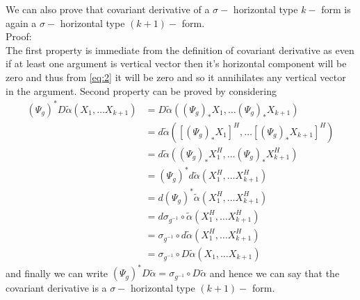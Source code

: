 \documentclass[12pt]{article}
\begin{document}
We can also prove that covariant derivative of a $\sigma-$ horizontal type $k-$ form is again a $\sigma-$ horizontal type $(k+1)-$ form. \\
Proof: \\
The first property is immediate from the definition of covariant derivative
as even if at least one argument is vertical vector then it's horizontal component will be zero and thus from \ref{eq:2} it will be zero and so it annihilates any vertical vector in the argument.
Second property can be proved by considering
\begin{align*}
    (\Psi_{g})^{\ast}D\tilde{\alpha}(X_{1}, \dots X_{k+1}) &= D\tilde{\alpha}((\Psi_{g})_{\ast}X_{1}, \dots (\Psi_{g})_{\ast}X_{k+1}) \\
                                                           &= d\tilde{\alpha}([(\Psi_{g})_{\ast}X_{1}]^{H}, \dots [(\Psi_{g})_{\ast}X_{k+1}]^{H}) \\
                                                           &= d\tilde{\alpha}((\Psi_{g})_{\ast}X^{H}_{1}, \dots (\Psi_{g})_{\ast}X^{H}_{k+1}) \\
                                                           &= (\Psi_{g})^{\ast}d\tilde{\alpha}(X^{H}_{1}, \dots X^{H}_{k+1}) \\
                                                           &= d(\Psi_{g})^{\ast}\tilde{\alpha}(X^{H}_{1}, \dots X^{H}_{k+1}) \\
                                                           &= d\sigma_{g^{-1}}\circ\tilde{\alpha}(X^{H}_{1}, \dots X^{H}_{k+1}) \\
                                                           &= \sigma_{g^{-1}}\circ d\tilde{\alpha}(X^{H}_{1}, \dots X^{H}_{k+1}) \\
                                                           &= \sigma_{g^{-1}}\circ D\tilde{\alpha}(X_{1}, \dots X_{k+1})
\end{align*} and finally we can write $(\Psi_{g})^{\ast}D\tilde{\alpha} = \sigma_{g^{-1}}\circ D\tilde{\alpha}$ and hence we can say that the covariant derivative is a $\sigma-$ horizontal type $(k+1)-$ form. 
\end{document}
